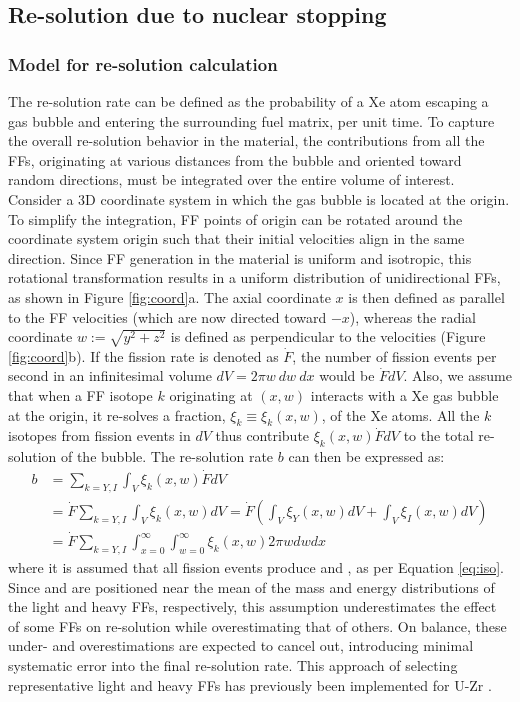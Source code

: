 \documentclass[review]{elsarticle}
\newcommand{\Y}{\ce{_{39}^{97}Y}\xspace}
\newcommand{\I}{\ce{_{53}^{136}I}\xspace}
\begin{document}
\subsection{Re-solution due to nuclear stopping}
\label{sec:nuke}

\subsubsection{Model for re-solution calculation}

The re-solution rate can be defined as the probability of a Xe atom escaping a gas bubble and entering the surrounding fuel matrix, per unit time. To capture the overall re-solution behavior in the material, the contributions from all the FFs, originating at various distances from the bubble and oriented toward random directions, must be integrated over the entire volume of interest. Consider a 3D coordinate system in which the gas bubble is located at the origin. To simplify the integration, FF points of origin can be rotated around the coordinate system origin such that their initial velocities align in the same direction. Since FF generation in the material is uniform and isotropic, this rotational transformation results in a uniform distribution of unidirectional FFs, as shown in Figure \ref{fig:coord}a. The axial coordinate $x$ is then defined as parallel to the FF velocities (which are now directed toward $-x$), whereas the radial coordinate $w := \sqrt{y^2+z^2}$ is defined as perpendicular to the velocities (Figure \ref{fig:coord}b). If the fission rate is denoted as $\dot{F}$, the number of fission events per second in an infinitesimal volume $dV = 2 \pi w \: dw  \: dx$ would be $\dot{F} dV$. Also, we assume that when a FF isotope $k$ originating at $(x, w)$ interacts with a Xe gas bubble at the origin, it re-solves a fraction, $\xi_k \equiv \xi_k(x, w)$, of the Xe atoms. All the $k$ isotopes from fission events in $dV$ thus contribute $\xi_k(x, w) \dot{F} dV$ to the total re-solution of the bubble. The re-solution rate $b$ can then be expressed as:
\begin{align}
	b &= \sum_{k = Y, I} \int_V \xi_k(x, w) \dot{F} dV \label{eq:b} \\
	  &= \dot{F} \sum_{k = Y, I} \int_V \xi_k(x, w) dV
	   = \dot{F} \left( \int_V \xi_Y(x, w) dV + \int_V \xi_I(x, w) dV \right) \\
	  &= \dot{F} \sum_{k = Y, I} \int_{x=0}^{\infty} \int_{w=0}^{\infty}
		\xi_k(x, w) 2 \pi w dw dx
\end{align}
where it is assumed that all fission events produce \Y and \I, as per Equation \ref{eq:iso}. Since \Y and \I are positioned near the mean of the mass and energy distributions of the light and heavy FFs, respectively, this assumption underestimates the effect of some FFs on re-solution while overestimating that of others. On balance, these under- and overestimations are expected to cancel out, introducing minimal systematic error into the final re-solution rate. This approach of selecting representative light and heavy FFs has previously been implemented for U-Zr \cite{mao2025}.
\end{document}
